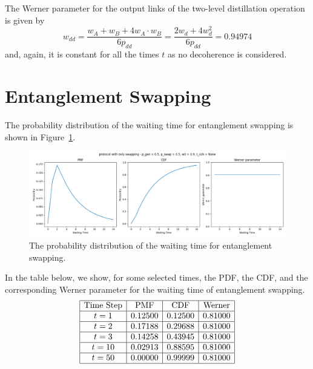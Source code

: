 \documentclass{masterthesis}
\begin{document}
The Werner parameter for the output links of the two-level distillation operation is given by
\begin{equation}
    w_{dd} = \frac{w_A + w_B + 4 w_A \cdot w_B}{6 p_{dd}} = \frac{2 w_d + 4 w_d^2}{6 p_{dd}} = 0.94974
\end{equation}
and, again, it is constant for all the times $t$ as no decoherence is considered.

\section{Entanglement Swapping}

The probability distribution of the waiting time for entanglement swapping is shown in Figure~\ref{fig:swap_waiting_time}.
\begin{figure}[ht]
    \centering
    \includegraphics[width=1\linewidth]{images/dist_tests/only swapping.png}
    \caption{The probability distribution of the waiting time for entanglement swapping.}
    \label{fig:swap_waiting_time}
\end{figure}

In the table below, we show, for some selected times, the PDF, the CDF, and the corresponding Werner parameter for the waiting time of entanglement swapping.
\begin{equation*}
    \begin{array}{|c|c|c|c|}
        \hline
        \text{Time Step} & \text{PMF} & \text{CDF} & \text{Werner} \\
        \hline
        t = 1 & 0.12500 & 0.12500 & 0.81000 \\
        \hline
        t = 2 & 0.17188 & 0.29688 & 0.81000 \\
        \hline
        t = 3 & 0.14258 & 0.43945 & 0.81000 \\
        \hline
        t = 10 & 0.02913 & 0.88595 & 0.81000 \\
        \hline
        t = 50 & 0.00000 & 0.99999 & 0.81000 \\
        \hline
    \end{array}
\end{equation*}


{\raggedright\printbibliography}
\end{document}
